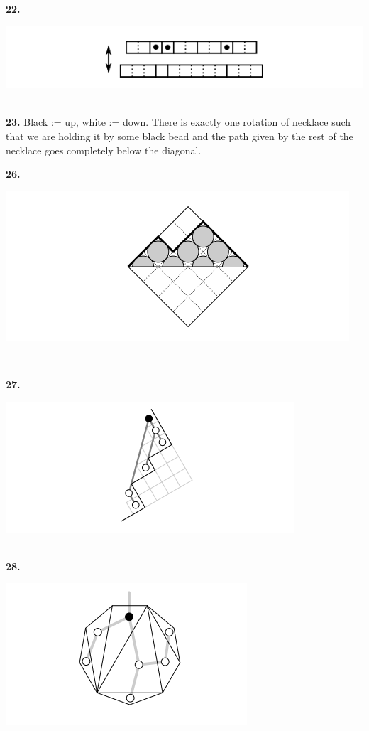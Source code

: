 \documentclass[11pt,a5paper]{article}
\begin{document}
\noindent\textbf{22.} \\
\centerline{\includegraphics[scale=0.44]{hint22}} \\

\noindent\textbf{23.} Black := up, white := down. There is exactly one rotation of necklace such that we are holding it by some black bead and the path given by the rest of the necklace goes completely below the diagonal.

\noindent\textbf{26.} \\
\centerline{\includegraphics[scale=0.4]{hint26}} \\

\break

\noindent\textbf{27.} \\
\centerline{\includegraphics[scale=0.4]{hint27}} \\

\noindent\textbf{28.} \\
\centerline{\includegraphics[scale=0.4]{hint28}} \\
\end{document}

